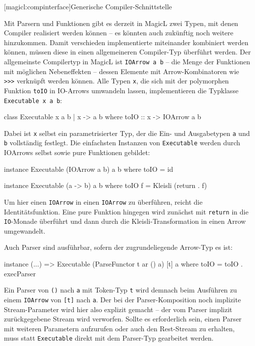 \documentclass[12pt, a4paper, bibgerm]{scrbook}
\newenvironment{DIFnomarkup}{}{}
\newcommand\icode[1]{\lstinline?#1?}
\newcommand\lsection{}
\begin{document}
\lsection[magicl:compinterface]{Generische Compiler-Schnittstelle}

Mit Parsern und Funktionen gibt es derzeit in MagicL zwei Typen, mit
denen Compiler realisiert werden können -- es könnten auch zukünftig
noch weitere hinzukommen. Damit verschieden implementierte miteinander
kombiniert werden können, müssen diese in einen allgemeineren
Compiler-Typ überführt werden. Der allgemeinste Compilertyp in MagicL
ist \icode{IOArrow a b} -- die Menge der Funktionen mit möglichen
Nebeneffekten -- dessen Elemente mit Arrow-Kombinatoren wie \icode{>>>}
verknüpft werden können. Alle Typen \icode{x}, die sich mit der
polymorphen Funktion \icode{toIO} in IO-Arrows umwandeln lassen,
implementieren die Typklasse \icode{Executable x a b}:
\begin{DIFnomarkup}\begin{code}
class Executable x a b | x -> a b where
  toIO :: x -> IOArrow a b
\end{code}\end{DIFnomarkup}
Dabei ist \icode{x} selbst ein parametrisierter Typ, der die Ein- und
Ausgabetypen \icode{a} und \icode{b} vollständig festlegt. Die
einfachsten Instanzen von \icode{Executable} werden durch IOArrows
selbst sowie pure Funktionen gebildet:
\begin{DIFnomarkup}\begin{code}
instance Executable (IOArrow a b) a b where
  toIO = id

instance Executable (a -> b) a b where
  toIO f = Kleisli (return . f)
\end{code}\end{DIFnomarkup}
Um hier einen \icode{IOArrow} in einen \icode{IOArrow} zu überführen,
reicht die Identitätsfunktion. Eine pure Funktion hingegen wird zunächst
mit \icode{return} in die \icode{IO}-Monade überführt und dann durch die
Kleisli-Transformation in einen Arrow umgewandelt.

Auch Parser sind ausführbar, sofern der zugrundeliegende Arrow-Typ es
ist:
\begin{DIFnomarkup}\begin{code}
instance (...) => Executable (ParseFunctor t ar () a) [t] a where
  toIO = toIO . execParser
\end{code}\end{DIFnomarkup}
Ein Parser von \icode{()} nach \icode{a} mit Token-Typ \icode{t} wird
demnach beim Ausführen zu einem \icode{IOArrow} von \icode{[t]} nach
\icode{a}. Der bei der Parser-Komposition noch implizite
Stream-Parameter wird hier also explizit gemacht -- der vom Parser
implizit zurückgegebene Stream wird verworfen. Sollte es erforderlich
sein, einen Parser mit weiteren Parametern aufzurufen oder auch den
Rest-Stream zu erhalten, muss statt \icode{Executable} direkt mit dem
Parser-Typ gearbeitet werden.
\end{document}

